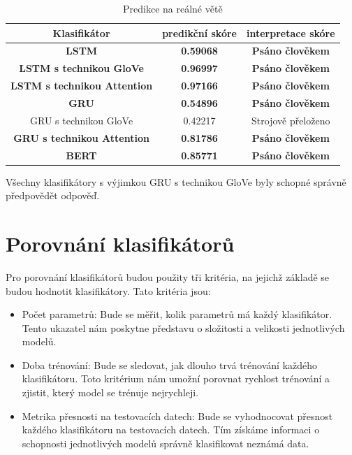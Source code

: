 \begin{table}[H]
	\centering
	\caption{Predikce na reálné větě}\label{tab:MULTI predikce}
	\begin{tabular}{ c c c }
			\toprule
			Klasifikátor & predikční skóre & interpretace skóre\\
			\midrule
			\textbf{LSTM} & \textbf{0.59068} & \textbf{Psáno člověkem}\\
			\textbf{LSTM s technikou GloVe} & \textbf{0.96997} & \textbf{Psáno člověkem}\\
			\textbf{LSTM s technikou Attention} & \textbf{0.97166} & \textbf{Psáno člověkem}\\
			\textbf{GRU} & \textbf{0.54896} & \textbf{Psáno člověkem}\\
			GRU s technikou GloVe & 0.42217 & Strojově přeloženo\\
			\textbf{GRU s technikou Attention} & \textbf{0.81786} & \textbf{Psáno člověkem}\\
			\textbf{BERT} & \textbf{0.85771} & \textbf{Psáno člověkem}\\
			\midrule
		\end{tabular}
\end{table}

Všechny klasifikátory s výjimkou GRU s technikou GloVe byly schopné správně předpovědět odpověď.

\section{Porovnání klasifikátorů}
Pro porovnání klasifikátorů budou použity tři kritéria, na jejichž základě se budou hodnotit klasifikátory.
Tato kritéria jsou:

\begin{itemize}\label{Kritéria}
	\item Počet parametrů: Bude se měřit, kolik parametrů má každý klasifikátor. Tento ukazatel nám poskytne představu o složitosti a velikosti jednotlivých modelů.
	\item Doba trénování: Bude se sledovat, jak dlouho trvá trénování každého klasifikátoru. Toto kritérium nám umožní porovnat rychlost trénování a zjistit, který model se trénuje nejrychleji.
	\item Metrika přesnosti na testovacích datech: Bude se vyhodnocovat přesnost každého klasifikátoru na testovacích datech. Tím získáme informaci o schopnosti jednotlivých modelů správně klasifikovat neznámá data.
\end{itemize}

